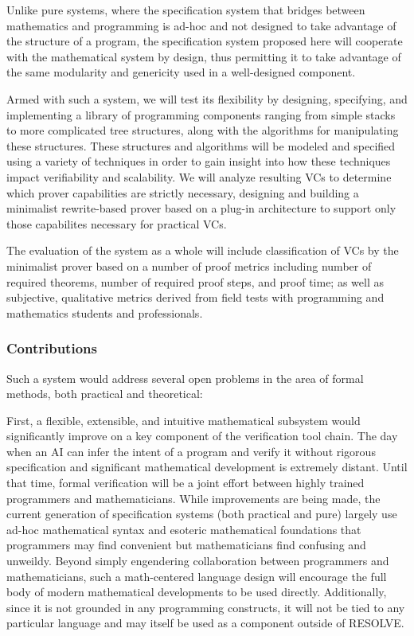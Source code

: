 Unlike pure systems, where the specification system that bridges between mathematics and programming is ad-hoc and not designed to take advantage of the structure of a program, the specification system proposed here will cooperate with the mathematical system by design, thus permitting it to take advantage of the same modularity and genericity used in a well-designed component.

Armed with such a system, we will test its flexibility by designing, specifying, and implementing a library of programming components ranging from simple stacks to more complicated tree structures, along with the algorithms for manipulating these structures.  These structures and algorithms will be modeled and specified using a variety of techniques in order to gain insight into how these techniques impact verifiability and scalability.  We will analyze resulting VCs to determine which prover capabilities are strictly necessary, designing and building a minimalist rewrite-based prover based on a plug-in architecture to support only those capabilites necessary for practical VCs.

The evaluation of the system as a whole will include classification of VCs by the minimalist prover based on a number of proof metrics including number of required theorems, number of required proof steps, and proof time; as well as subjective, qualitative metrics derived from field tests with programming and mathematics students and professionals.

\subsubsection{Contributions\label{sec:contributions}}
Such a system would address several open problems in the area of formal methods, both practical and theoretical:

First, a flexible, extensible, and intuitive mathematical subsystem would significantly improve on a key component of the verification tool chain.  The day when an AI can infer the intent of a program and verify it without rigorous specification and significant mathematical development is extremely distant.  Until that time, formal verification will be a joint effort between highly trained programmers and mathematicians.  While improvements are being made\cite{wenzelIsar}, the current generation of specification systems (both practical and pure) largely use ad-hoc mathematical syntax and esoteric mathematical foundations that programmers may find convenient but mathematicians find confusing and unweildy.  Beyond simply engendering collaboration between programmers and mathematicians, such a math-centered language design will encourage the full body of modern mathematical developments to be used directly.  Additionally, since it is not grounded in any programming constructs, it will not be tied to any particular language and may itself be used as a component outside of RESOLVE.

